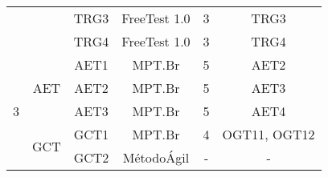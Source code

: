 \begin{table}[H]
{\begin{tabular}{|c|c|c|c|c|c|}
                                                                                      & \multicolumn{1}{l|}{}                     & TRG3                      & FreeTest 1.0                     & 3                                                                               & TRG3                                                                                 \\ \cline{3-6} 
                                                                                      & \multicolumn{1}{l|}{}                     & TRG4                      & FreeTest 1.0                     & 3                                                                               & TRG4                                                                                 \\ \hline
\multirow{9}{*}{3}                                                                    & \multirow{3}{*}{AET}                      & AET1                      & MPT.Br                           & 5                                                                               & AET2                                                                                 \\ \cline{3-6} 
                                                                                      &                                           & AET2                      & MPT.Br                           & 5                                                                               & AET3                                                                                 \\ \cline{3-6} 
                                                                                      &                                           & AET3                      & MPT.Br                           & 5                                                                               & AET4                                                                                 \\ \cline{2-6} 
                                                                                      & \multirow{3}{*}{GCT}                      & GCT1                      & MPT.Br                           & 4                                                                               & OGT11, OGT12                                                                         \\ \cline{3-6} 
                                                                                      &                                           & \multicolumn{1}{l|}{GCT2} & MétodoÁgil                       & -                                                                               & -                                                                                    \\ \cline{3-6} 

\end{tabular}}
\end{table}
